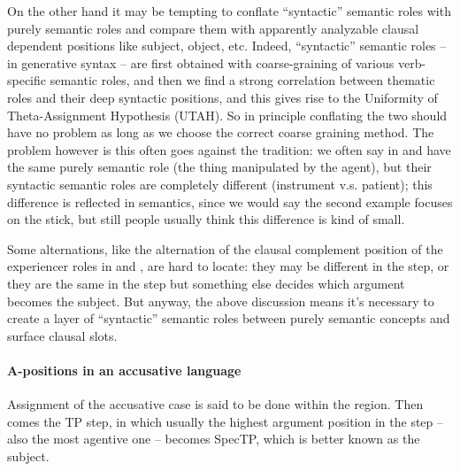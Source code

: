 {On the other hand it may be tempting to conflate 
``syntactic'' semantic roles with purely semantic roles 
and compare them with apparently analyzable clausal dependent positions 
like subject, object, etc.
Indeed, ``syntactic'' semantic roles --  in generative syntax -- 
are first obtained with coarse-graining of 
various verb-specific semantic roles,
and then we find a strong correlation between thematic roles 
and their deep syntactic positions, 
and this gives rise to the Uniformity of Theta-Assignment Hypothesis (UTAH).
So in principle conflating the two should have no problem
as long as we choose the correct coarse graining method.
The problem however is this often goes against the tradition:
we often say  in  and 
have the same purely semantic role (the thing manipulated by the agent),
but their syntactic semantic roles are completely different
(instrument v.s. patient);
this difference is reflected in semantics, 
since we would say the second example focuses on the stick,
but still people usually think this difference is kind of small.

Some alternations, like the alternation of the clausal complement position of 
the experiencer roles in  
 and ,
are hard to locate: 
they may be different in the \vP{} step,
or they are the same in the \vP{} step but something else decides 
which argument becomes the subject.
But anyway, the above discussion means it's necessary to create 
a layer of ``syntactic'' semantic roles
between purely semantic concepts and surface clausal slots.

\paragraph{A-positions in an accusative language} 
Assignment of the accusative case is said to be done within the \vP region.
Then comes the TP step, in which
usually the highest argument position in the \vP{} step -- also the most agentive one --
becomes SpecTP, 
which is better known as the subject.

}
